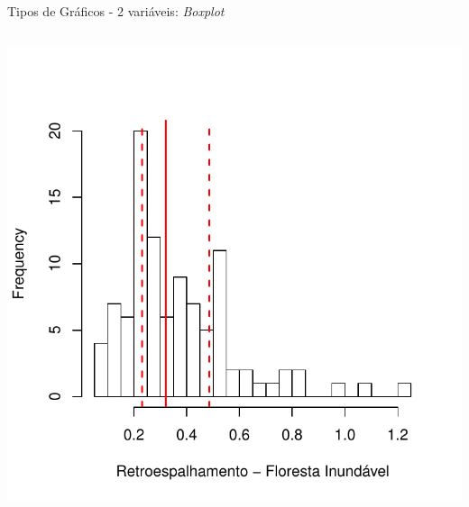 \documentclass{beamer}\usepackage[]{graphicx}\usepackage[]{color}
\newenvironment{knitrout}{}{} %
\renewenvironment{knitrout}{\setlength{\topsep}{0mm}}{}
\begin{document}
\begin{frame}[fragile]{Tipos de Gráficos - 2 variáveis: \emph{Boxplot}}


\begin{columns}[t]


\begin{knitrout}
\color{fgcolor}
\includegraphics[width=1\linewidth]{figure/unnamed-chunk-70-1} 

\end{knitrout}




\end{columns}
\end{frame}
\end{document}
